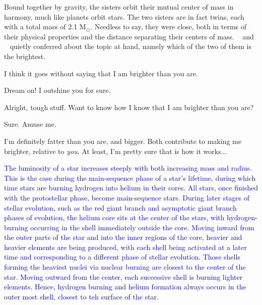 \documentclass[main.tex]{subfiles}
\begin{document}
\par \nar Bound together by gravity, the sisters orbit their mutual center of mass in harmony, much like planets orbit stars.  The two sisters are in fact twins, each with a total mass of 2.1 M$_{\odot}$.  Needless to say, they were close, both in terms of their physical properties and the distance separating their centers of mass.  \rmtaygete~ and \rmalcyone~ quietly conferred about the topic at hand, namely which of the two of them is the brightest.


\par \Taygete I think it goes without saying that I am brighter than you are.

\par \Alcyone Dream on!  I outshine you for sure.

\par \Taygete Alright, tough stuff.  Want to know how I know that I am brighter than you are?

\par \Alcyone Sure.  Amuse me.

\par \Taygete I'm definitely fatter than you are, and bigger.  Both contribute to making me brighter, relative to \textit{you}.  At least, I'm pretty sure that is how it works...  

\begin{tcolorbox}[sharp corners, colback=blue!30, colframe=blue!80!blue, title=Dependence of Luminosity on Mass and Radius]
\par \textcolor{blue} {The luminosity of a star increases steeply with both increasing mass and radius.  This is the case during the main-sequence phase of a star's lifetime, during which time stars are burning hydrogen into helium in their cores.  All stars, once finished with the protostellar phase, become main-sequence stars.  During later stages of stellar evolution, such as the red giant branch and asymptotic giant branch phases of evolution, the helium core sits at the center of the stars, with hydrogen-burning occurring in the shell immediately outside the core.  Moving inward from the outer parts of the star and into the inner regions of the core, heavier and heavier elements are being produced, with each shell being activated at a later time and corresponding to a different phase of stellar evolution.  Those shells forming the heaviest nuclei via nuclear burning are closest to the center of the star.  Moving outward from the center, each successive shell is burning lighter elements.  Hence, hydrogen burning and helium formation always occurs in the outer most shell, closest to teh surface of the star.}
\end{tcolorbox}
\end{document}
